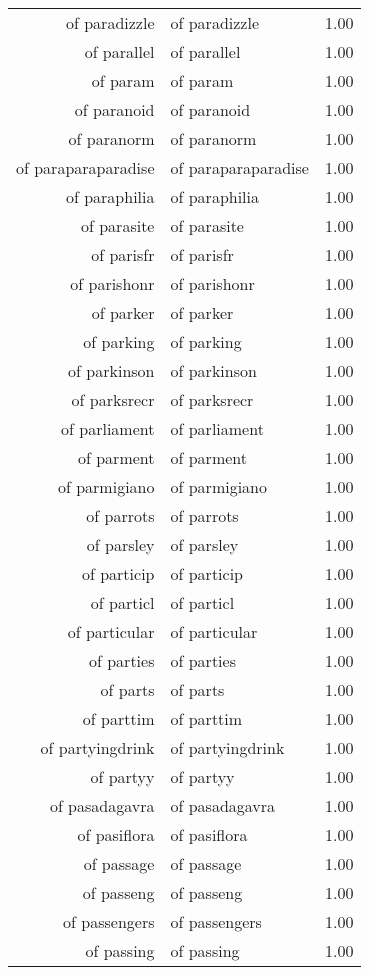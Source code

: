 \begin{table}[ht]
\begin{tabular}{rlr}
  of paradizzle & of paradizzle & 1.00 \\ 
  of parallel & of parallel & 1.00 \\ 
  of param & of param & 1.00 \\ 
  of paranoid & of paranoid & 1.00 \\ 
  of paranorm & of paranorm & 1.00 \\ 
  of paraparaparadise & of paraparaparadise & 1.00 \\ 
  of paraphilia & of paraphilia & 1.00 \\ 
  of parasite & of parasite & 1.00 \\ 
  of parisfr & of parisfr & 1.00 \\ 
  of parishonr & of parishonr & 1.00 \\ 
  of parker & of parker & 1.00 \\ 
  of parking & of parking & 1.00 \\ 
  of parkinson & of parkinson & 1.00 \\ 
  of parksrecr & of parksrecr & 1.00 \\ 
  of parliament & of parliament & 1.00 \\ 
  of parment & of parment & 1.00 \\ 
  of parmigiano & of parmigiano & 1.00 \\ 
  of parrots & of parrots & 1.00 \\ 
  of parsley & of parsley & 1.00 \\ 
  of particip & of particip & 1.00 \\ 
  of particl & of particl & 1.00 \\ 
  of particular & of particular & 1.00 \\ 
  of parties & of parties & 1.00 \\ 
  of parts & of parts & 1.00 \\ 
  of parttim & of parttim & 1.00 \\ 
  of partyingdrink & of partyingdrink & 1.00 \\ 
  of partyy & of partyy & 1.00 \\ 
  of pasadagavra & of pasadagavra & 1.00 \\ 
  of pasiflora & of pasiflora & 1.00 \\ 
  of passage & of passage & 1.00 \\ 
  of passeng & of passeng & 1.00 \\ 
  of passengers & of passengers & 1.00 \\ 
  of passing & of passing & 1.00 \\ 

\end{tabular}
\end{table}
